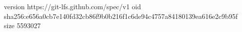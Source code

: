 version https://git-lfs.github.com/spec/v1
oid sha256:e656a0cb7e140fd32cb86f9b0b216f1c6de94c4757a84180139ea616e2c9b95f
size 5593027

